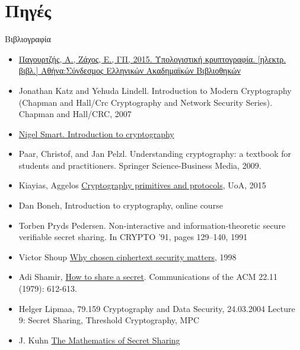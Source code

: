 \documentclass[handout]{beamer}
\begin{document}
\section{Πηγές}
\begin{frame}[allowframebreaks]{Βιβλιογραφία}
\begin{tiny}
\begin{itemize}
\item \href{http://hdl.handle.net/11419/5439}{Παγουρτζής, Α., Ζάχος, Ε., ΓΠ, 2015. Υπολογιστική κρυπτογραφία. [ηλεκτρ. βιβλ.] Αθήνα:Σύνδεσμος Ελληνικών Ακαδημαϊκών Βιβλιοθηκών}
\item Jonathan Katz and Yehuda Lindell. Introduction to Modern Cryptography (Chapman and Hall/Crc Cryptography and Network Security Series). Chapman
and Hall/CRC, 2007
\item \href{http://goo.gl/b75I29}{Nigel Smart. Introduction to cryptography} 
\item Paar, Christof, and Jan Pelzl. Understanding cryptography: a textbook for students and practitioners. Springer Science-Business Media, 2009.
\item Kiayias, Aggelos  \href{http://crypto.di.uoa.gr/class/Kryptographia/Semeioseis_files/Cryptograph_Primitives_and_Protocols.pdf}{Cryptography primitives and protocols}, UoA, 2015
\item Dan Boneh, Introduction to cryptography, online course
\item Torben Pryds Pedersen. Non-interactive and information-theoretic secure verifiable secret sharing. In CRYPTO ’91, pages 129–140, 1991
\item Victor Shoup \href{http://www.shoup.net/papers/expo.pdf}{Why chosen ciphertext security matters}, 1998
\item Adi Shamir, \href{http://www5.in.tum.de/lehre/vorlesungen/konkr_math/WS_10_11/prog/shamir.pdf}{How to share a secret}.  Communications of the ACM 22.11 (1979): 612-613.
\item Helger Lipmaa, 79.159 Cryptography and Data Security, 24.03.2004 Lecture 9: Secret Sharing, Threshold Cryptography, MPC 
\item J. Kuhn \href{https://jeremykun.com/2014/06/23/the-mathematics-of-secret-sharing/}{The Mathematics of Secret Sharing}
\end{itemize}
\end{tiny}
\end{frame}

 
\end{document}
